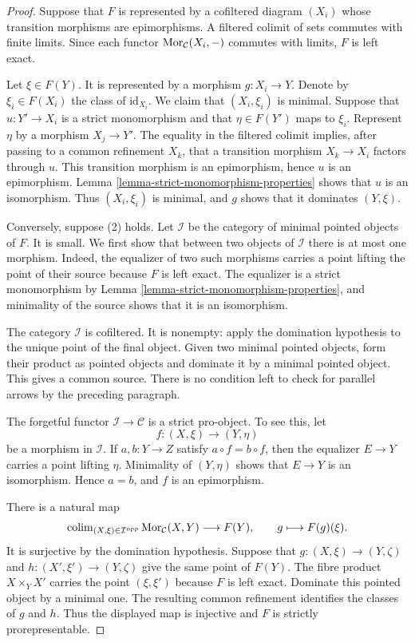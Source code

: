 \begin{proof}
Suppose that $F$ is represented by a cofiltered diagram $(X_i)$ whose
transition morphisms are epimorphisms. A filtered colimit of sets commutes
with finite limits. Since each functor
$\mathop{\mathrm{Mor}}\nolimits_\mathcal{C}(X_i, -)$ commutes with limits, $F$ is left exact.

Let $\xi \in F(Y)$. It is represented by a morphism $g : X_i \to Y$.
Denote by $\xi_i \in F(X_i)$ the class of $\text{id}_{X_i}$. We claim that
$(X_i, \xi_i)$ is minimal. Suppose that $u : Y' \to X_i$ is a strict
monomorphism and that $\eta \in F(Y')$ maps to $\xi_i$. Represent $\eta$
by a morphism $X_j \to Y'$. The equality in the filtered colimit implies,
after passing to a common refinement $X_k$, that a transition morphism
$X_k \to X_i$ factors through $u$. This transition morphism is an
epimorphism, hence $u$ is an epimorphism. Lemma
\ref{lemma-strict-monomorphism-properties} shows that $u$ is an isomorphism.
Thus $(X_i, \xi_i)$ is minimal, and $g$ shows that it dominates
$(Y, \xi)$.

Conversely, suppose (2) holds. Let $\mathcal{I}$ be the category of minimal
pointed objects of $F$. It is small. We first show that between two objects
of $\mathcal{I}$ there is at most one morphism. Indeed, the equalizer of two
such morphisms carries a point lifting the point of their source because
$F$ is left exact. The equalizer is a strict monomorphism by Lemma
\ref{lemma-strict-monomorphism-properties}, and minimality of the source
shows that it is an isomorphism.

The category $\mathcal{I}$ is cofiltered. It is nonempty: apply the
domination hypothesis to the unique point of the final object. Given two
minimal pointed objects, form their product as pointed objects and dominate
it by a minimal pointed object. This gives a common source. There is no
condition left to check for parallel arrows by the preceding paragraph.

The forgetful functor $\mathcal{I} \to \mathcal{C}$ is a strict
pro-object. To see this, let
$$
f : (X, \xi) \longrightarrow (Y, \eta)
$$
be a morphism in $\mathcal{I}$. If $a, b : Y \to Z$ satisfy
$a \circ f = b \circ f$, then the equalizer $E \to Y$ carries a point
lifting $\eta$. Minimality of $(Y, \eta)$ shows that $E \to Y$ is an
isomorphism. Hence $a = b$, and $f$ is an epimorphism.

There is a natural map
$$
\mathop{\mathrm{colim}}\nolimits_{(X, \xi) \in \mathcal{I}^{opp}}
\mathop{\mathrm{Mor}}\nolimits_\mathcal{C}(X, Y) \longrightarrow F(Y),
\qquad
g \longmapsto F(g)(\xi).
$$
It is surjective by the domination hypothesis. Suppose that
$g : (X, \xi) \to (Y, \zeta)$ and
$h : (X', \xi') \to (Y, \zeta)$ give the same point of $F(Y)$.
The fibre product $X \times_Y X'$ carries the point $(\xi, \xi')$
because $F$ is left exact. Dominate this pointed object by a minimal one.
The resulting common refinement identifies the classes of $g$ and $h$.
Thus the displayed map is injective and $F$ is strictly prorepresentable.
\end{proof}

